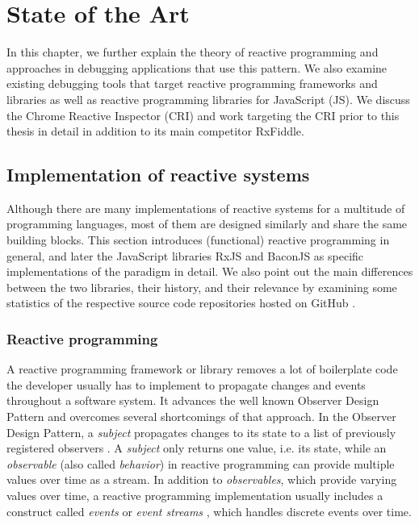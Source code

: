 \chapter{State of the Art}
\label{ch:StateOfTheArt}
In this chapter, we further explain the theory of reactive programming and approaches in debugging applications that use this pattern. We also examine existing debugging tools that target reactive programming frameworks and libraries as well as reactive programming libraries for JavaScript (JS). We discuss the Chrome Reactive Inspector (CRI) and work targeting the CRI prior to this thesis in detail in addition to its main competitor RxFiddle.

\section{Implementation of reactive systems}
Although there are many implementations of reactive systems for a multitude of programming languages, most of them are designed similarly and share the same building blocks. This section introduces (functional) reactive programming in general, and later the JavaScript libraries RxJS and BaconJS as specific implementations of the paradigm in detail. We also point out the main differences between the two libraries, their history, and their relevance by examining some statistics of the respective source code repositories hosted on GitHub \cite{RxJSRepo} \cite{BaconJSRepo}.

	\subsection{Reactive programming}
	A reactive programming framework or library removes a lot of boilerplate code the developer usually has to implement to propagate changes and events throughout a software system. It advances the well known Observer Design Pattern and overcomes several shortcomings of that approach. In the Observer Design Pattern, a \emph{subject} propagates changes to its state to a list of previously registered observers \cite{FRP}. A \emph{subject} only returns one value, i.e. its state, while an \emph{observable} (also called \emph{behavior}) in reactive programming can provide multiple values over time as a stream.
	In addition to \emph{observables}, which provide varying values over time, a reactive programming implementation usually includes a construct called \emph{events} or \emph{event streams} \cite{BaconJS}, which handles discrete events over time.
	
